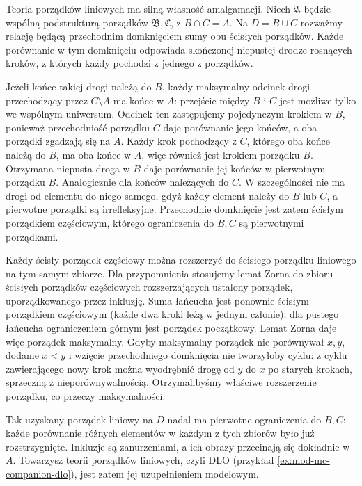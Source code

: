 \begin{przyklad}
\label{ex:mod-mc-orders-ap}
Teoria porządków liniowych ma silną własność amalgamacji.
Niech $\mathfrak A$ będzie wspólną podstrukturą
porządków $\mathfrak B,\mathfrak C$, z $B\cap C=A$.
Na $D=B\cup C$ rozważmy relację będącą przechodnim
domknięciem sumy obu ścisłych porządków.
Każde porównanie w tym domknięciu odpowiada skończonej
niepustej drodze rosnących kroków, z których każdy
pochodzi z jednego z porządków.

Jeżeli końce takiej drogi należą do $B$, każdy
maksymalny odcinek drogi przechodzący przez
$C\setminus A$ ma końce w $A$: przejście między
$B$ i $C$ jest możliwe tylko we wspólnym uniwersum.
Odcinek ten zastępujemy pojedynczym krokiem w $B$,
ponieważ przechodniość porządku $C$ daje porównanie
jego końców, a oba porządki zgadzają się na $A$.
Każdy krok pochodzący z $C$, którego oba końce
należą do $B$, ma oba końce w $A$, więc również
jest krokiem porządku $B$.
Otrzymana niepusta droga w $B$ daje porównanie
jej końców w pierwotnym porządku $B$.
Analogicznie dla końców należących do $C$.
W szczególności nie ma drogi od elementu do niego
samego, gdyż każdy element należy do $B$ lub $C$,
a pierwotne porządki są irrefleksyjne.
Przechodnie domknięcie jest zatem ścisłym porządkiem
częściowym, którego ograniczenia do $B,C$ są
pierwotnymi porządkami.

Każdy ścisły porządek częściowy można rozszerzyć
do ścisłego porządku liniowego na tym samym zbiorze.
Dla przypomnienia stosujemy lemat Zorna do zbioru
ścisłych porządków częściowych rozszerzających
ustalony porządek, uporządkowanego przez inkluzję.
Suma łańcucha jest ponownie ścisłym porządkiem
częściowym (każde dwa kroki leżą w jednym członie);
dla pustego łańcucha ograniczeniem górnym jest
porządek początkowy. Lemat Zorna daje więc porządek
maksymalny.
Gdyby maksymalny porządek nie porównywał $x,y$,
dodanie $x<y$ i wzięcie przechodniego domknięcia
nie tworzyłoby cyklu: z cyklu zawierającego nowy
krok można wyodrębnić drogę od $y$ do $x$ po starych
krokach, sprzeczną z nieporównywalnością.
Otrzymalibyśmy właściwe rozszerzenie porządku,
co przeczy maksymalności.

Tak uzyskany porządek liniowy na $D$ nadal ma
pierwotne ograniczenia do $B,C$: każde porównanie
różnych elementów w każdym z tych zbiorów było
już rozstrzygnięte. Inkluzje są zanurzeniami,
a ich obrazy przecinają się dokładnie w $A$.
Towarzysz teorii porządków liniowych, czyli DLO
(przykład \ref{ex:mod-mc-companion-dlo}), jest
zatem jej uzupełnieniem modelowym.
\end{przyklad}

